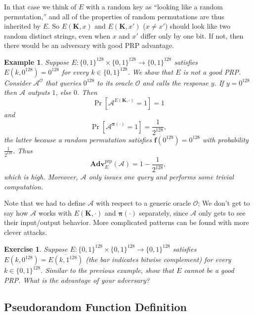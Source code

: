 \documentclass[11pt]{article}
\newtheorem{exercise}{Exercise}
\newtheorem{example}{Example}
\newcommand{\calA}{\mathcal{A}}
\newcommand{\AES}{\mathsf{AES}}
\newcommand{\calO}{\mathcal{O}}
\newcommand{\Adv}{\mathbf{Adv}}
\newcommand{\AdvPRP}[2]{\Adv^{\mathrm{prp}}_{#1}({#2})}
\newcommand{\bits}{\{0,1\}}
\newcommand{\bK}{\mathbf{K}}
\newcommand{\bof}{\mathbf{f}}
\newcommand{\bop}{\bm{\pi}}
\begin{document}
In that case we think of $E$ with a random key as ``looking like a
random permutation,'' and all of the properties of random permutations are thus
inherited by $E$. So $E(\bK,x)$ and $E(\bK,x')$ ($x\neq x'$) should look like 
two random distinct strings, even when $x$ and $x'$ differ only by one
bit. If not, then there would be an adversary with good PRP advantage.
\begin{example}
    Suppose $E:\bits^{128}\times\bits^{128}\to\bits^{128}$ satisfies
    $E(k,0^{128})=0^{128}$ for every $k\in\bits^{128}$. We show that
    $E$ is not a good PRP. Consider $\calA^\calO$ that queries $0^{128}$
    to its oracle $\calO$ and calls the response $y$. If $y=0^{128}$
    then $\calA$ outputs $1$, else $0$. Then
    \[
        \Pr[\calA^{E(\bK,\cdot)}=1]=1
    \]
    and
    \[
        \Pr[\calA^{\bop(\cdot)}=1] = \frac{1}{2^{128}},
    \]
    the latter because a random permutation satisfies $\bof(0^{128})=0^{128}$
    with probability $\frac{1}{2^{128}}$. Thus
    \[
        \AdvPRP{E}{\calA} = 1 - \frac{1}{2^{128}},
    \]
    which is high. Moreover, $\calA$ only issues one query and performs
    some trivial computation.
\end{example}
Note that we had to define $\calA$ with respect to a generic oracle $\calO$;
We don't get to say how $\calA$ works with $E(\bK,\cdot)$ and $\bop(\cdot)$
separately, since $\calA$ only gets to see their input/output behavior.
More complicated patterns can be found with more clever attacks.
\begin{exercise}
 Suppose $E:\bits^{128}\times\bits^{128}\to\bits^{128}$ satisfies
    $E(k,0^{128})=\overline{E(k,1^{128})}$ (the bar indicates bitwise
    complement) for every $k\in\bits^{128}$. Similar to the previous
    example, show that $E$ cannot be a good PRP. What is the advantage
    of your adversary?
\end{exercise}


\subsection{Pseudorandom Function Definition}
\end{document}
